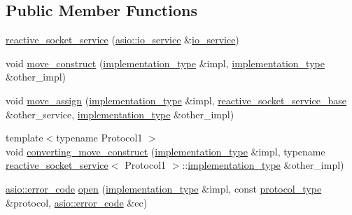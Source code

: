 \subsection*{Public Member Functions}
\begin{DoxyCompactItemize}
\item 
\hyperlink{classasio_1_1detail_1_1reactive__socket__service_ab63d938125d604a5fcef0f78a7c9d043}{reactive\+\_\+socket\+\_\+service} (\hyperlink{classasio_1_1io__service}{asio\+::io\+\_\+service} \&\hyperlink{classasio_1_1io__service}{io\+\_\+service})
\item 
void \hyperlink{classasio_1_1detail_1_1reactive__socket__service_ae1441700ea6d87fd072b286ee12134e7}{move\+\_\+construct} (\hyperlink{structasio_1_1detail_1_1reactive__socket__service_1_1implementation__type}{implementation\+\_\+type} \&impl, \hyperlink{structasio_1_1detail_1_1reactive__socket__service_1_1implementation__type}{implementation\+\_\+type} \&other\+\_\+impl)
\item 
void \hyperlink{classasio_1_1detail_1_1reactive__socket__service_a6b48c5b36ee3264c0ffe3abfa6605d1a}{move\+\_\+assign} (\hyperlink{structasio_1_1detail_1_1reactive__socket__service_1_1implementation__type}{implementation\+\_\+type} \&impl, \hyperlink{classasio_1_1detail_1_1reactive__socket__service__base}{reactive\+\_\+socket\+\_\+service\+\_\+base} \&other\+\_\+service, \hyperlink{structasio_1_1detail_1_1reactive__socket__service_1_1implementation__type}{implementation\+\_\+type} \&other\+\_\+impl)
\item 
{\footnotesize template$<$typename Protocol1 $>$ }\\void \hyperlink{classasio_1_1detail_1_1reactive__socket__service_a655ed90a8215e4b9e90cd22c2583b429}{converting\+\_\+move\+\_\+construct} (\hyperlink{structasio_1_1detail_1_1reactive__socket__service_1_1implementation__type}{implementation\+\_\+type} \&impl, typename \hyperlink{classasio_1_1detail_1_1reactive__socket__service}{reactive\+\_\+socket\+\_\+service}$<$ Protocol1 $>$\+::\hyperlink{structasio_1_1detail_1_1reactive__socket__service_1_1implementation__type}{implementation\+\_\+type} \&other\+\_\+impl)
\item 
\hyperlink{classasio_1_1error__code}{asio\+::error\+\_\+code} \hyperlink{classasio_1_1detail_1_1reactive__socket__service_a661580f3233d95ae3a3a59054c526a65}{open} (\hyperlink{structasio_1_1detail_1_1reactive__socket__service_1_1implementation__type}{implementation\+\_\+type} \&impl, const \hyperlink{classasio_1_1detail_1_1reactive__socket__service_a622bd8618dbd40771a5b6a66eb1b75e9}{protocol\+\_\+type} \&protocol, \hyperlink{classasio_1_1error__code}{asio\+::error\+\_\+code} \&ec)

\end{DoxyCompactItemize}
